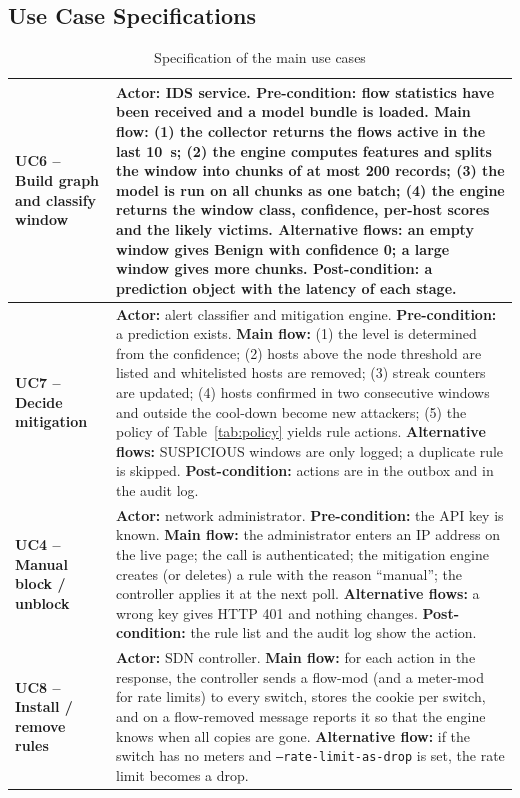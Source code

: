 \subsection{Use Case Specifications}
\begin{longtable}{|p{3.0cm}|p{11.0cm}|}
\caption{Specification of the main use cases}\label{tab:ucspec}\\
\hline
\endfirsthead
\hline
\endhead
\textbf{UC6 -- Build graph and classify window} & \textbf{Actor:} IDS service. \textbf{Pre-condition:} flow statistics have been received and a model bundle is loaded. \textbf{Main flow:} (1) the collector returns the flows active in the last 10~s; (2) the engine computes features and splits the window into chunks of at most 200 records; (3) the model is run on all chunks as one batch; (4) the engine returns the window class, confidence, per-host scores and the likely victims. \textbf{Alternative flows:} an empty window gives Benign with confidence 0; a large window gives more chunks. \textbf{Post-condition:} a prediction object with the latency of each stage. \\ \hline
\textbf{UC7 -- Decide mitigation} & \textbf{Actor:} alert classifier and mitigation engine. \textbf{Pre-condition:} a prediction exists. \textbf{Main flow:} (1) the level is determined from the confidence; (2) hosts above the node threshold are listed and whitelisted hosts are removed; (3) streak counters are updated; (4) hosts confirmed in two consecutive windows and outside the cool-down become new attackers; (5) the policy of Table~\ref{tab:policy} yields rule actions. \textbf{Alternative flows:} SUSPICIOUS windows are only logged; a duplicate rule is skipped. \textbf{Post-condition:} actions are in the outbox and in the audit log. \\ \hline
\textbf{UC4 -- Manual block / unblock} & \textbf{Actor:} network administrator. \textbf{Pre-condition:} the API key is known. \textbf{Main flow:} the administrator enters an IP address on the live page; the call is authenticated; the mitigation engine creates (or deletes) a rule with the reason ``manual''; the controller applies it at the next poll. \textbf{Alternative flows:} a wrong key gives HTTP 401 and nothing changes. \textbf{Post-condition:} the rule list and the audit log show the action. \\ \hline
\textbf{UC8 -- Install / remove rules} & \textbf{Actor:} SDN controller. \textbf{Main flow:} for each action in the response, the controller sends a flow-mod (and a meter-mod for rate limits) to every switch, stores the cookie per switch, and on a flow-removed message reports it so that the engine knows when all copies are gone. \textbf{Alternative flow:} if the switch has no meters and \texttt{--rate-limit-as-drop} is set, the rate limit becomes a drop. \\ \hline
\end{longtable}

